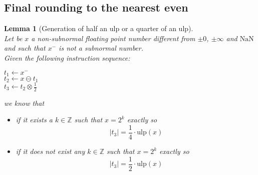 \documentclass[a4paper,10pt,twoside]{article}
\newtheorem{lemma}[theorem]{Lemma}
\newcommand{\Z}{\ensuremath{\mathbb {Z}}}
\newcommand{\mUlp}{\ensuremath{\mathrm{ulp}}}
\newcommand{\nan}{\ensuremath{\mathrm{NaN}}}
\begin{document}
\subsection{Final rounding to the nearest even}
\begin{lemma}[Generation of half an $\mUlp$ or a quarter of an $\mUlp$] \label{genmiquartulp} ~\\
Let be $x$ a non-subnormal floating point number different from $\pm 0$, $\pm \infty$ and $\nan$ and such that $x^-$ 
is not a subnormal number. \\
Given the following instruction sequence:
\begin{center}
$t_1 \gets x^-$ \\
$t_2 \gets x \ominus t_1$ \\
$t_3 \gets t_2 \otimes \frac{1}{2}$ 
\end{center}
we know that 
\begin{itemize}
\item if it exists a $k \in \Z$ such that $x=2^k$ exactly so 
$$\left \vert t_3 \right \vert = \frac{1}{4} \cdot \mUlp \left( x \right)$$
\item if it does not exist any $k \in \Z$ such that $x=2^k$ exactly so
$$\left \vert t_3 \right \vert = \frac{1}{2} \cdot \mUlp \left( x \right)$$
\end{itemize}
\end{lemma}
\end{document}
